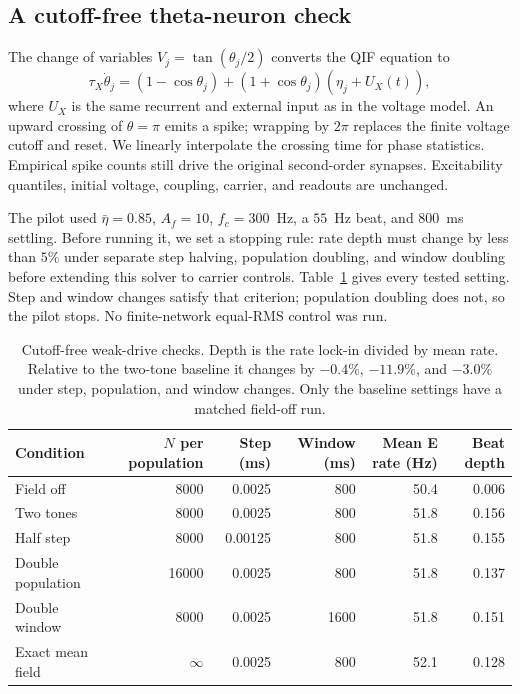 \documentclass[11pt,a4paper]{article}
\newif\ifjne
\begin{document}
\ifjne
\subsection{A cutoff-free theta-neuron check}\label{supp:theta-pilot}
The change of variables $V_j=\tan(\theta_j/2)$ converts the QIF equation to
\[
\tau_X\dot\theta_j=(1-\cos\theta_j)
 +(1+\cos\theta_j)(\eta_j+U_X(t)),
\]
where $U_X$ is the same recurrent and external input as in the voltage model.
An upward crossing of $\theta=\pi$ emits a spike; wrapping by $2\pi$ replaces
the finite voltage cutoff and reset. We linearly interpolate the crossing
time for phase statistics. Empirical spike counts still drive the original
second-order synapses. Excitability quantiles, initial voltage, coupling,
carrier, and readouts are unchanged.

The pilot used $\bar\eta=0.85$, $A_f=10$, $f_c=300$~Hz, a $55$~Hz beat,
and $800$~ms settling. Before running it, we set a stopping rule: rate depth
must change by less than $5\%$ under separate step halving, population
doubling, and window doubling before extending this solver to carrier controls.
Table~\ref{tab:theta-pilot} gives every tested setting. Step and window changes
satisfy that criterion; population doubling does not, so the pilot stops.
No finite-network equal-RMS control was run.

\begin{table}[htbp]
\centering\small
\begin{tabular}{@{}lrrrrr@{}}
\toprule
Condition & $N$ per population & Step (ms) & Window (ms) & Mean E rate (Hz) & Beat depth\\
\midrule
Field off & 8000 & 0.0025 & 800 & 50.4 & 0.006\\
Two tones & 8000 & 0.0025 & 800 & 51.8 & 0.156\\
Half step & 8000 & 0.00125 & 800 & 51.8 & 0.155\\
Double population & 16000 & 0.0025 & 800 & 51.8 & 0.137\\
Double window & 8000 & 0.0025 & 1600 & 51.8 & 0.151\\
Exact mean field & $\infty$ & 0.0025 & 800 & 52.1 & 0.128\\
\bottomrule
\end{tabular}
\caption{Cutoff-free weak-drive checks. Depth is the rate lock-in divided by
mean rate. Relative to the two-tone baseline it changes by $-0.4\%$,
$-11.9\%$, and $-3.0\%$ under step, population, and window changes.
Only the baseline settings have a matched field-off run.}
\label{tab:theta-pilot}
\end{table}
\end{document}
